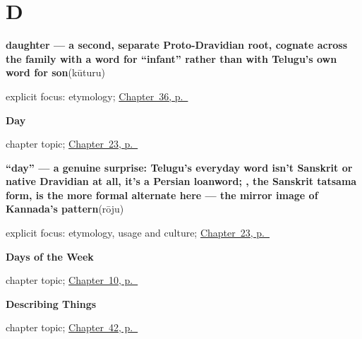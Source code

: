 \section*{D}

\noindent\begin{minipage}[t]{\linewidth}
\raggedright
\textbf{daughter — a second, separate Proto-Dravidian root, cognate across the family with a word for \textquotedblleft{}infant\textquotedblright{} rather than with Telugu's own word for son}\enspace\emph{}\enspace(kūturu)\par
\footnotesize explicit focus: etymology; \hyperref[ch:te-son-and-daughter]{Chapter~36, p.~\pageref*{ch:te-son-and-daughter}}
\end{minipage}\par\smallskip

\noindent\begin{minipage}[t]{\linewidth}
\raggedright
\textbf{Day}\par
\footnotesize chapter topic; \hyperref[ch:te-day]{Chapter~23, p.~\pageref*{ch:te-day}}
\end{minipage}\par\smallskip

\noindent\begin{minipage}[t]{\linewidth}
\raggedright
\textbf{\textquotedblleft{}day\textquotedblright{} — a genuine surprise: Telugu's everyday word isn't Sanskrit or native Dravidian at all, it's a Persian loanword; , the Sanskrit tatsama form, is the more formal alternate here — the mirror image of Kannada's pattern}\enspace\emph{}\enspace(rōju)\par
\footnotesize explicit focus: etymology, usage and culture; \hyperref[ch:te-day]{Chapter~23, p.~\pageref*{ch:te-day}}
\end{minipage}\par\smallskip

\noindent\begin{minipage}[t]{\linewidth}
\raggedright
\textbf{Days of the Week}\par
\footnotesize chapter topic; \hyperref[ch:te-days-of-the-week]{Chapter~10, p.~\pageref*{ch:te-days-of-the-week}}
\end{minipage}\par\smallskip

\noindent\begin{minipage}[t]{\linewidth}
\raggedright
\textbf{Describing Things}\par
\footnotesize chapter topic; \hyperref[ch:te-describing-things]{Chapter~42, p.~\pageref*{ch:te-describing-things}}
\end{minipage}\par\smallskip

